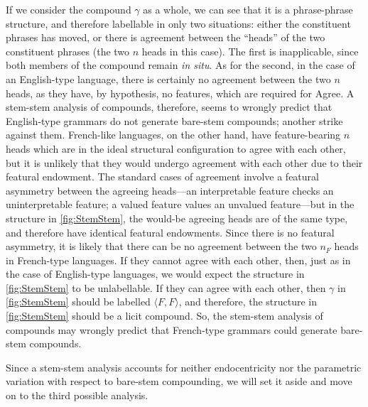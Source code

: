 \documentclass[MilwayThesis]{subfiles}
\begin{document}
If we consider the compound $\gamma$ as a whole, we can see that it is a phrase-phrase structure, and therefore labellable in only two situations:
	either the constituent phrases has moved, or there is agreement between the ``heads'' of the two constituent phrases (the two $n$ heads in this case).
The first is inapplicable, since both members of the compound remain \textit{in situ}.
As for the second, in the case of an English-type language, there is certainly no agreement between the two $n$ heads, as they have, by hypothesis, no features, which are required for Agree.
A stem-stem analysis of compounds, therefore, seems to wrongly predict that English-type grammars do not generate bare-stem compounds; another strike against them.
French-like languages, on the other hand, have feature-bearing $n$ heads which are in the ideal structural configuration to agree with each other, but it is unlikely that they would undergo agreement with each other due to their featural endowment.
The standard cases of agreement involve a featural asymmetry between the agreeing heads---an interpretable feature checks an uninterpretable feature; a valued feature values an unvalued feature---but in the structure in \cref{fig:StemStem}, the would-be agreeing heads are of the same type, and therefore have identical featural endowments.
Since there is no featural asymmetry, it is likely that there can be no agreement between the two $n_{F}$ heads in French-type languages.
If they cannot agree with each other, then, just as in the case of English-type languages, we would expect the structure in \cref{fig:StemStem} to be unlabellable.
If they can agree with each other, then $\gamma$ in \cref{fig:StemStem} should be labelled $\langle F,F\rangle$, and therefore, the structure in \cref{fig:StemStem} should be a licit compound.
So, the stem-stem analysis of compounds may wrongly predict that French-type grammars could generate bare-stem compounds.

Since a stem-stem analysis accounts for neither endocentricity nor the parametric variation with respect to bare-stem compounding, we will set it aside and move on to the third possible analysis.
\end{document}
